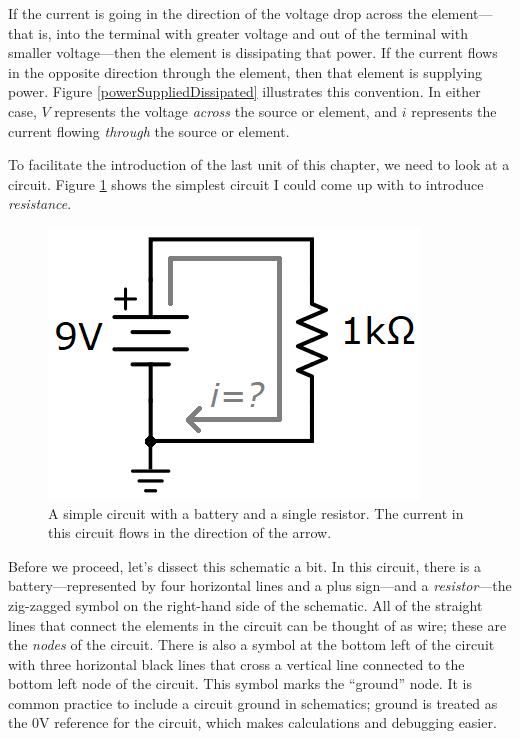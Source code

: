 If the current is going in the direction of the voltage drop across the element---that is, into the terminal with greater voltage and out of the terminal with smaller voltage---then the element is dissipating that power. If the current flows in the opposite direction through the element, then that element is supplying power. Figure \ref{powerSuppliedDissipated} illustrates this convention. In either case, $V$ represents the voltage \textit{across} the source or element, and $i$ represents the current flowing \textit{through} the source or element.
\par
To facilitate the introduction of the last unit of this chapter, we need to look at a circuit. Figure \ref{resistorBatteryCircuit} shows the simplest circuit I could come up with to introduce \textit{resistance}.
\begin{figure}[h!]
\centering
\includegraphics{figures/batteryResistorCircuit.png}
\caption{A simple circuit with a battery and a single resistor. The current in this circuit flows in the direction of the arrow.}
\label{resistorBatteryCircuit}
\end{figure}
Before we proceed, let's dissect this schematic a bit. In this circuit, there is a battery---represented by four horizontal lines and a plus sign---and a \textit{resistor}---the zig-zagged symbol on the right-hand side of the schematic. All of the straight lines that connect the elements in the circuit can be thought of as wire; these are the \textit{nodes} of the circuit. There is also a symbol at the bottom left of the circuit with three horizontal black lines that cross a vertical line connected to the bottom left node of the circuit. This symbol marks the ``ground'' node. It is common practice to include a circuit ground in schematics; ground is treated as the 0V reference for the circuit, which makes calculations and debugging easier. 
\par
